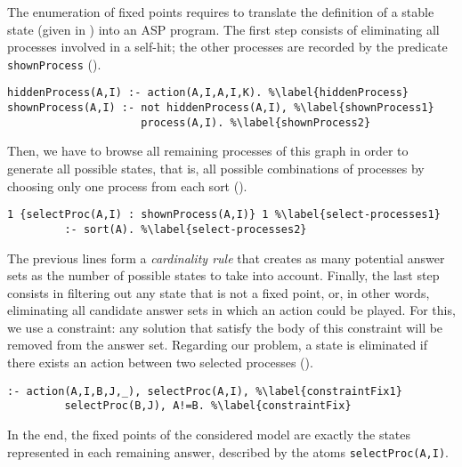 The enumeration of fixed points requires to translate the definition of a stable state (given in )
into an ASP program.
The first step consists of eliminating all processes involved in a self-hit;
the other processes are recorded by the predicate \texttt{shownProcess} ().
\begin{lstlisting}
hiddenProcess(A,I) :- action(A,I,A,I,K). %\label{hiddenProcess}
shownProcess(A,I) :- not hiddenProcess(A,I), %\label{shownProcess1}
                     process(A,I). %\label{shownProcess2}
\end{lstlisting}
Then, we have to browse all remaining processes of this graph in order to generate all possible states,
that is, all possible combinations of processes by choosing only one process from each sort ().
\begin{lstlisting}
1 {selectProc(A,I) : shownProcess(A,I)} 1 %\label{select-processes1}
         :- sort(A). %\label{select-processes2}
\end{lstlisting}
The previous lines form a \emph{cardinality rule} that creates as many potential answer sets as the number of possible states
to take into account.
Finally, the last step consists in filtering out any state that is not a fixed point,
or, in other words, eliminating all candidate answer sets in which an action could be played. %
For this, we use a constraint:
any solution that satisfy the body of this constraint will be removed from the answer set.
Regarding our problem, a state is eliminated if there exists an action between two selected processes ().
\begin{lstlisting}
:- action(A,I,B,J,_), selectProc(A,I), %\label{constraintFix1}
         selectProc(B,J), A!=B. %\label{constraintFix}
\end{lstlisting}
In the end, the fixed points of the considered model are exactly the states represented in each remaining answer,
described by the atoms \texttt{selectProc(A,I)}.

